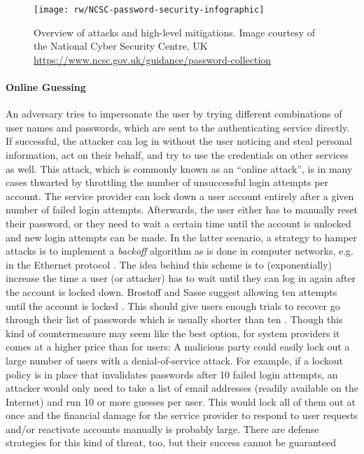 \begin{figure}[h!]
	\centering
	\texttt{[image: rw/NCSC-password-security-infographic]}
	\caption{
		\label{fig:rw:attacks_infographic}
		Overview of attacks and high-level mitigations. Image courtesy of the National Cyber Security Centre, UK \protect\url{https://www.ncsc.gov.uk/guidance/password-collection} \protect{}
	}
\end{figure}


\paragraph{Online Guessing} 
An adversary tries to impersonate the user by trying different combinations of user names and passwords, which are sent to the authenticating service directly. If successful, the attacker can log in without the user noticing and steal personal information, act on their behalf, and try to use the credentials on other services as well. 
	This attack, which is commonly known as an ``online attack'', is in many cases thwarted by throttling the number of unsuccessful login attempts per account. The service provider can lock down a user account entirely after a given number of failed login attempts. Afterwards, the user either has to manually reset their password, or they need to wait a certain time until the account is unlocked and new login attempts can be made. In the latter scenario, a strategy to hamper attacks is to implement a \textit{backoff} algorithm as is done in computer networks, e.g. in the Ethernet protocol \cite[p. 285]{Tanenbaum2011ComputerNetworks}. The idea behind this scheme is to (exponentially) increase the time a user (or attacker) has to wait until they can log in again after the account is locked down. Brostoff and Sasse suggest allowing ten attempts until the account is locked \cite{Brostoff2003TenStrikes}. This should give users enough trials to recover go through their list of passwords which is usually shorter than ten \cite{Florencio2007LargeScaleStudyPasswordHabits}. Though this kind of countermeasure may seem like the best option, for system providers it comes at a higher price than for users: A malicious party could easily lock out a large number of users with a denial-of-service attack. For example, if a lockout policy is in place that invalidates passwords after 10 failed login attempts, an attacker would only need to take a list of email addresses (readily available on the Internet) and run 10 or more guesses per user. This would lock all of them out at once and the financial damage for the service provider to respond to user requests and/or reactivate accounts manually is probably large. There are defense strategies for this kind of threat, too, but their success cannot be guaranteed \cite{Florencio2010WhereDoPoliciesComeFrom}
	
